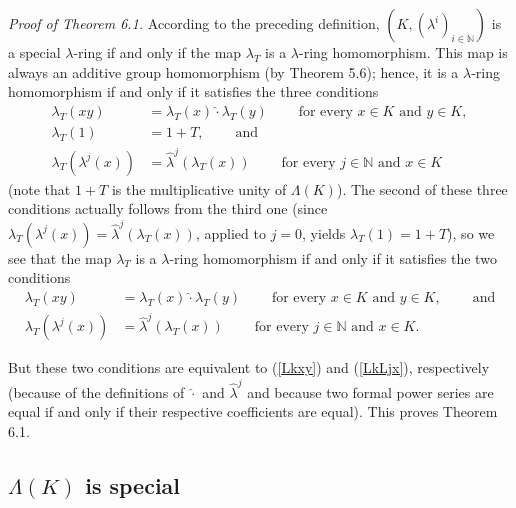 \documentclass[numbers=enddot,12pt,final,onecolumn,notitlepage]{scrartcl}%
\begin{document}
\textit{Proof of Theorem 6.1.} According to the preceding definition, $\left(
K,\left(  \lambda^{i}\right)  _{i\in\mathbb{N}}\right)  $ is a special
$\lambda$-ring if and only if the map $\lambda_{T}$ is a $\lambda$-ring
homomorphism. This map is always an additive group homomorphism (by Theorem
5.6); hence, it is a $\lambda$-ring homomorphism if and only if it satisfies
the three conditions%
\begin{align*}
\lambda_{T}\left(  xy\right)   &  =\lambda_{T}\left(  x\right)  \widehat{\cdot
}\lambda_{T}\left(  y\right)  \ \ \ \ \ \ \ \ \ \ \text{for every }x\in
K\text{ and }y\in K,\\
\lambda_{T}\left(  1\right)   &  =1+T,\ \ \ \ \ \ \ \ \ \ \text{and}\\
\lambda_{T}\left(  \lambda^{j}\left(  x\right)  \right)   &  =\widehat{\lambda
}^{j}\left(  \lambda_{T}\left(  x\right)  \right)
\ \ \ \ \ \ \ \ \ \ \text{for every }j\in\mathbb{N}\text{ and }x\in K
\end{align*}
(note that $1+T$ is the multiplicative unity of $\Lambda\left(  K\right)  $).
The second of these three conditions actually follows from the third one
(since $\lambda_{T}\left(  \lambda^{j}\left(  x\right)  \right)
=\widehat{\lambda}^{j}\left(  \lambda_{T}\left(  x\right)  \right)  $, applied
to $j=0$, yields $\lambda_{T}\left(  1\right)  =1+T$), so we see that the map
$\lambda_{T}$ is a $\lambda$-ring homomorphism if and only if it satisfies the
two conditions%
\begin{align*}
\lambda_{T}\left(  xy\right)   &  =\lambda_{T}\left(  x\right)  \widehat{\cdot
}\lambda_{T}\left(  y\right)  \ \ \ \ \ \ \ \ \ \ \text{for every }x\in
K\text{ and }y\in K,\ \ \ \ \ \ \ \ \ \ \text{and}\\
\lambda_{T}\left(  \lambda^{j}\left(  x\right)  \right)   &  =\widehat{\lambda
}^{j}\left(  \lambda_{T}\left(  x\right)  \right)
\ \ \ \ \ \ \ \ \ \ \text{for every }j\in\mathbb{N}\text{ and }x\in K.
\end{align*}


But these two conditions are equivalent to (\ref{Lkxy}) and (\ref{LkLjx}),
respectively (because of the definitions of $\widehat{\cdot}$ and
$\widehat{\lambda}^{j}$ and because two formal power series are equal if and
only if their respective coefficients are equal). This proves Theorem 6.1.

\subsection{$\Lambda\left(  K\right)  $ is special}
\end{document}
